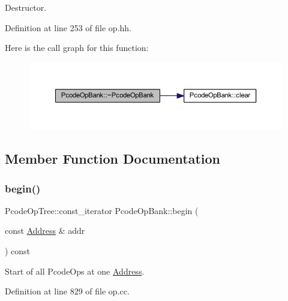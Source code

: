 Destructor. 



Definition at line 253 of file op.\+hh.

Here is the call graph for this function\+:
\nopagebreak
\begin{figure}[H]
\begin{center}
\leavevmode
\includegraphics[width=350pt]{class_pcode_op_bank_af8613c0a59c2de072acc830f3b24b8e9_cgraph}
\end{center}
\end{figure}


\subsection{Member Function Documentation}
\mbox{\label{class_pcode_op_bank_aa5c89c7f2fbad97596cef0e46b4f3a8e}} 
\subsubsection{\texorpdfstring{begin()}{begin()}\hspace{0.1cm}{\footnotesize\ttfamily [1/2]}}
{\footnotesize\ttfamily Pcode\+Op\+Tree\+::const\+\_\+iterator Pcode\+Op\+Bank\+::begin (\begin{DoxyParamCaption}\item[{const \mbox{\hyperlink{class_address}{Address}} \&}]{addr }\end{DoxyParamCaption}) const}



Start of all Pcode\+Ops at one \mbox{\hyperlink{class_address}{Address}}. 



Definition at line 829 of file op.\+cc.

